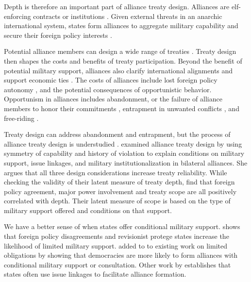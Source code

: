 \documentclass[12pt]{article}
\begin{document}
Depth is therefore an important part of alliance treaty design.
Alliances are elf-enforcing contracts or institutions \citep{Leedsetal2002, Morrow2000}.
Given external threats in an anarchic international system, states form alliances to aggregate military capability and secure their foreign policy interests \citep{Altfield1984, Smith1995, Snyder1997, FordhamPoast2014}. 


Potential alliance members can design a wide range of treaties \citep{Leedsetal2000, Leedsetal2002, Benson2012, BensonClinton2016}. 
Treaty design then shapes the costs and benefits of treaty participation. 
Beyond the benefit of potential military support, alliances also clarify international alignments \citep{Snyder1990} and support economic ties \citep{Gowa1995, Li2003, Long2003, Fordham2010, WolfordKim2017}. 
The costs of alliances include lost foreign policy autonomy \citep{Altfield1984, Morrow2000, Johnson2015}, and the potential consequences of opportunistic behavior. 
Opportunism in alliances includes abandonment, or the failure of alliance members to honor their commitments \citep{Leeds2003a, BerkemeierFuhrmann2018}, entrapment in unwanted conflicts \citep{Snyder1984}, and free-riding \citep{Morrow2000}.   


Treaty design can address abandonment and entrapment, but the process of alliance treaty design is understudied \citep{Poast2019a}. 
\citet{Mattes2012} examined alliance treaty design by using symmetry of capability and history of violation to explain conditions on military support, issue linkages, and military institutionalization in bilateral alliances. 
She argues that all three design considerations increase treaty reliability.  
While checking the validity of their latent measure of treaty depth, \citet{BensonClinton2016} find that foreign policy agreement, major power involvement and treaty scope are all positively correlated with depth. 
Their latent measure of scope is based on the type of military support offered and conditions on that support. 


We have a better sense of when states offer conditional military support. 
\citet{Benson2012} shows that foreign policy disagreements and revisionist protege states increase the likelihood of limited military support.
\citep{Chibaetal2015} added to to existing work on limited obligations by showing that democracies are more likely to form alliances with conditional military support or consultation. 
Other work by \citet{Poast2012, Poast2013} establishes that states often use issue linkages to facilitate alliance formation. 
\end{document}
